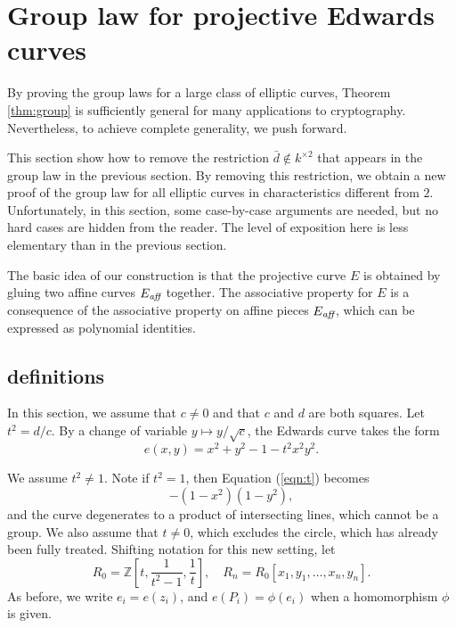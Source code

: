 \documentclass[12pt]{article}
\newcommand{\ring}[1]{\mathbb{#1}}
\newcommand{\op}[1]{\hbox{#1}}
\newcommand{\Eaff}{E_{\op{\scriptsize\it aff}}}
\newcommand{\Eoo}{E^{\circ}} %
\begin{document}
\section{Group law for projective Edwards curves}

By proving the group laws for a large class of elliptic curves,
Theorem \ref{thm:group} is sufficiently general for many applications
to cryptography.  Nevertheless, to achieve complete generality, we
push forward.

This section show how to remove the restriction $\bar d\not\in
k^{\times 2}$ that appears in the group law in the previous section.
By removing this restriction, we obtain a new proof of the group law
for all elliptic curves in characteristics different from $2$.
Unfortunately, in this section, some case-by-case arguments are
needed, but no hard cases are hidden from the reader.
The level of exposition here is less elementary than in the 
previous section.

The basic idea of our construction is that the projective
curve $E$ is obtained by gluing two affine curves $\Eaff$
together.  The associative property for $E$ is a consequence
of the associative property on affine pieces $\Eaff$, which
can be expressed as polynomial identities.




\subsection{definitions}


In this section, we assume that $c\ne 0$ and that $c$ and $d$ are both
squares.  Let $t^2 = d/c$.  By a change of variable $y\mapsto
y/\sqrt{c}$, the Edwards curve takes the form
\begin{equation}\label{eqn:t}
e(x,y)= x^2 + y^2 -1 - t^2 x^2 y^2.
\end{equation}

We assume $t^2\ne 1$.  Note if $t^2=1$, then Equation (\ref{eqn:t})
becomes
\[
-(1-x^2)(1-y^2),
\]
and the curve degenerates to a product of intersecting lines, which cannot be a
group.  We also assume that $t\ne 0$, which excludes the circle, which
has already been fully treated.  Shifting notation for this new
setting, let
\[
R_0 = \ring{Z}[t,\frac{1}{t^2-1},\frac1t],\quad
R_n = R_0[x_1,y_1,\ldots,x_n,y_n].
\]
As before, we write $e_i = e(z_i)$, and $ e(P_i) = \phi(e_i)$ when a
homomorphism $\phi$ is given.
\end{document}
